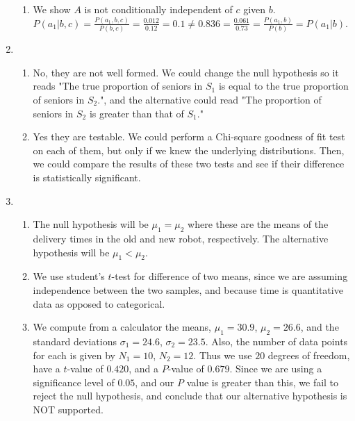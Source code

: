\documentclass[10pt,oneside,reqno]{amsart}
\theoremstyle{plain}
\theoremstyle{definition}
\begin{document}
\begin{enumerate}[label=\arabic*.]
\begin{enumerate}
\item We show $A$ is not conditionally independent of $c$ given $b$. $P(a_1|b,c) = \frac{P(a_1,b,c)}{P(b,c)} = \frac{0.012}{0.12} = 0.1 \neq 0.836 = \frac{0.061}{0.73} = \frac{P(a_1,b)}{P(b)} = P(a_1|b)$. 

\end{enumerate}

\item 

\begin{enumerate}

\item No, they are not well formed. We could change the null hypothesis so it reads "The true proportion of seniors in $S_1$ is equal to the true proportion of seniors in $S_2$.", and the alternative could read "The proportion of seniors in $S_2$ is greater than that of $S_1$."

\item Yes they are testable. We could perform a Chi-square goodness of fit test on each of them, but only if we knew the underlying distributions. Then, we could compare the results of these two tests and see if their difference is statistically significant. 

\end{enumerate}

\item 

\begin{enumerate}

\item The null hypothesis will be $\mu_1 = \mu_2$ where these are the means of the delivery times in the old and new robot, respectively. The alternative hypothesis will be $\mu_1 < \mu_2$. 

\item We use student's $t$-test for difference of two means, since we are assuming independence between the two samples, and because time is quantitative data as opposed to categorical. 

\item We compute from a calculator the means, $\mu_1 = 30.9$, $\mu_2 = 26.6$, and the standard deviations $\sigma_1 = 24.6$, $\sigma_2 = 23.5$. Also, the number of data points for each is given by $N_1 = 10$, $N_2 = 12$. Thus we use $20$ degrees of freedom, have a $t$-value of $0.420$, and a $P$-value of $0.679$. Since we are using a significance level of $0.05$, and our $P$ value is greater than this, we fail to reject the null hypothesis, and conclude that our alternative hypothesis is NOT supported. 

\end{enumerate}


\end{enumerate}
\end{document}
